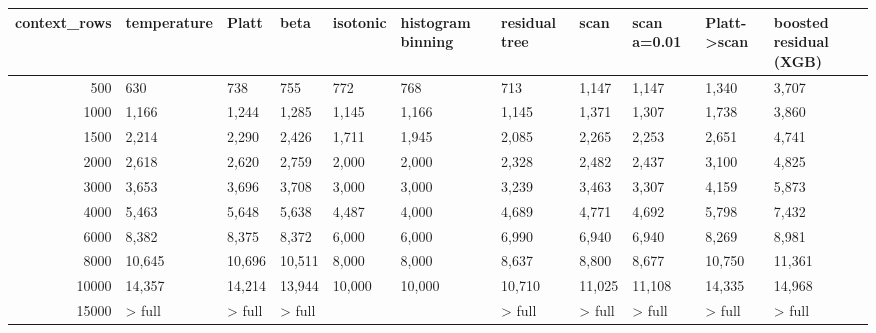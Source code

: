 \begin{tabular}{rllllllllll}
\toprule
context_rows & temperature & Platt & beta & isotonic & histogram binning & residual tree & scan & scan a=0.01 & Platt->scan & boosted residual (XGB) \\
\midrule
500 & 630 & 738 & 755 & 772 & 768 & 713 & 1,147 & 1,147 & 1,340 & 3,707 \\
1000 & 1,166 & 1,244 & 1,285 & 1,145 & 1,166 & 1,145 & 1,371 & 1,307 & 1,738 & 3,860 \\
1500 & 2,214 & 2,290 & 2,426 & 1,711 & 1,945 & 2,085 & 2,265 & 2,253 & 2,651 & 4,741 \\
2000 & 2,618 & 2,620 & 2,759 & 2,000 & 2,000 & 2,328 & 2,482 & 2,437 & 3,100 & 4,825 \\
3000 & 3,653 & 3,696 & 3,708 & 3,000 & 3,000 & 3,239 & 3,463 & 3,307 & 4,159 & 5,873 \\
4000 & 5,463 & 5,648 & 5,638 & 4,487 & 4,000 & 4,689 & 4,771 & 4,692 & 5,798 & 7,432 \\
6000 & 8,382 & 8,375 & 8,372 & 6,000 & 6,000 & 6,990 & 6,940 & 6,940 & 8,269 & 8,981 \\
8000 & 10,645 & 10,696 & 10,511 & 8,000 & 8,000 & 8,637 & 8,800 & 8,677 & 10,750 & 11,361 \\
10000 & 14,357 & 14,214 & 13,944 & 10,000 & 10,000 & 10,710 & 11,025 & 11,108 & 14,335 & 14,968 \\
15000 & > full & > full & > full &  &  & > full & > full & > full & > full & > full \\
\bottomrule
\end{tabular}
